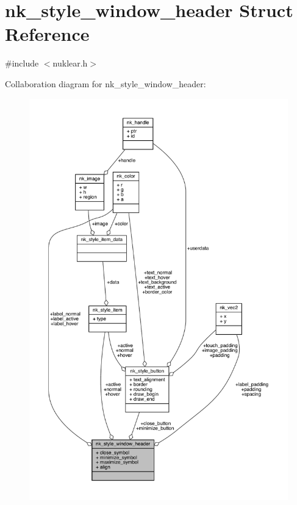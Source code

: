 \hypertarget{structnk__style__window__header}{}\section{nk\+\_\+style\+\_\+window\+\_\+header Struct Reference}
\label{structnk__style__window__header}


{\ttfamily \#include $<$nuklear.\+h$>$}



Collaboration diagram for nk\+\_\+style\+\_\+window\+\_\+header\+:
\nopagebreak
\begin{figure}[H]
\begin{center}
\leavevmode
\includegraphics[width=350pt]{structnk__style__window__header__coll__graph}
\end{center}
\end{figure}
